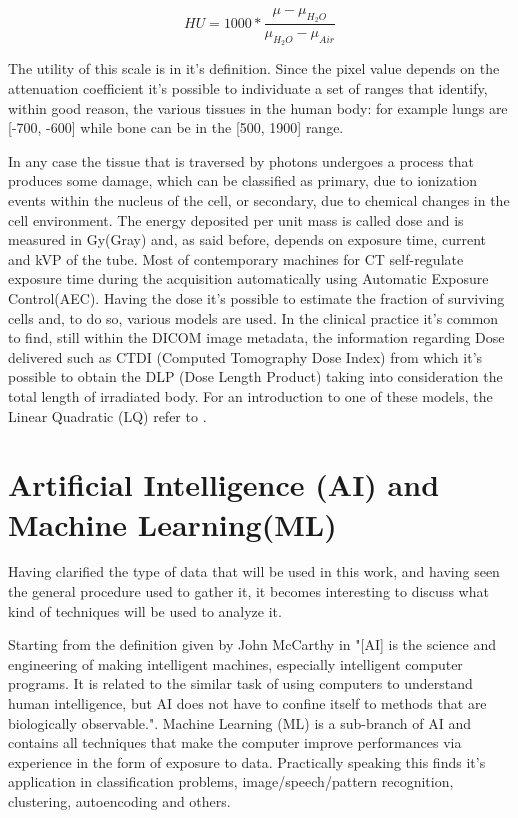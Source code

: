\begin{equation}\label{eq:HU_def}
    HU = 1000*\frac{\mu - \mu_{H_2O}}{\mu_{H_2O} - \mu_{Air}}
\end{equation}

The utility of this scale is in it's definition. Since the pixel value depends on the attenuation coefficient it's possible to individuate a set of ranges that identify, within good reason, the various  tissues in the human body: for example lungs are [-700, -600] while bone can be in the [500, 1900] range.

In any case the tissue that is traversed by photons undergoes a process that produces some damage, which can be classified as primary, due to ionization events within the nucleus of the cell, or secondary, due to chemical changes in the cell environment. The energy deposited per unit mass is called dose and is measured in Gy(Gray) and, as said before, depends on exposure time, current and kVP of the tube. Most of contemporary machines for CT self-regulate exposure time during the acquisition automatically using Automatic Exposure Control(AEC). Having the dose it's possible to estimate the fraction of surviving cells and, to do so, various models are used. In the clinical practice it's common to find, still within the DICOM image metadata, the information regarding Dose delivered such as CTDI (Computed Tomography Dose Index) from which it's possible to obtain the DLP (Dose Length Product) taking into consideration the total length of irradiated body. For an introduction to one of these models, the Linear Quadratic (LQ) refer to \cite{LQ_model}.

\section{Artificial Intelligence (AI) and Machine Learning(ML)}
Having clarified the type of data that will be used in this work, and having seen the general procedure used to gather it, it becomes interesting to discuss what kind of techniques will be used to analyze it.

Starting from the definition given by John McCarthy in \cite{AI_def} "[AI] is the science and engineering of making intelligent machines, especially intelligent computer programs. It is related to the similar task of using computers to understand human intelligence, but AI does not have to confine itself to methods that are biologically observable.". Machine Learning (ML) is a sub-branch of AI and contains all techniques that make the computer improve performances via experience in the form of exposure to data. Practically speaking this finds it's application in classification problems, image/speech/pattern recognition, clustering, autoencoding and others.


